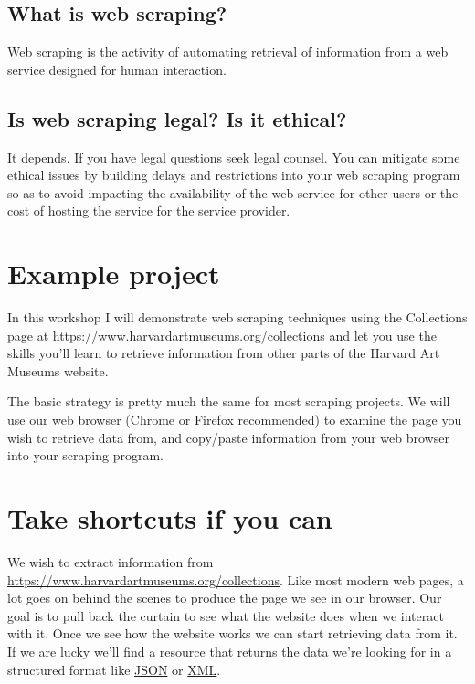 \documentclass[]{book}
\begin{document}
\subsection{What is web scraping?}\label{what-is-web-scraping}

Web scraping is the activity of automating retrieval of information from
a web service designed for human interaction.

\subsection{Is web scraping legal? Is it
ethical?}\label{is-web-scraping-legal-is-it-ethical}

It depends. If you have legal questions seek legal counsel. You can
mitigate some ethical issues by building delays and restrictions into
your web scraping program so as to avoid impacting the availability of
the web service for other users or the cost of hosting the service for
the service provider.

\section{Example project}\label{example-project-1}

In this workshop I will demonstrate web scraping techniques using the
Collections page at \url{https://www.harvardartmuseums.org/collections}
and let you use the skills you'll learn to retrieve information from
other parts of the Harvard Art Museums website.

The basic strategy is pretty much the same for most scraping projects.
We will use our web browser (Chrome or Firefox recommended) to examine
the page you wish to retrieve data from, and copy/paste information from
your web browser into your scraping program.

\section{Take shortcuts if you can}\label{take-shortcuts-if-you-can}

We wish to extract information from
\url{https://www.harvardartmuseums.org/collections}. Like most modern
web pages, a lot goes on behind the scenes to produce the page we see in
our browser. Our goal is to pull back the curtain to see what the
website does when we interact with it. Once we see how the website works
we can start retrieving data from it. If we are lucky we'll find a
resource that returns the data we're looking for in a structured format
like \href{https://json.org/}{JSON} or
\href{https://en.wikipedia.org/wiki/XML}{XML}.
\end{document}
